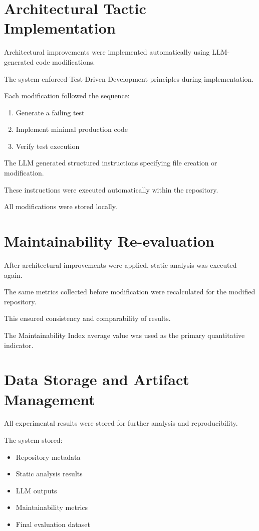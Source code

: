 \section{Architectural Tactic Implementation}

Architectural improvements were implemented automatically using LLM-generated code modifications.

The system enforced Test-Driven Development principles during implementation.

Each modification followed the sequence:

\begin{enumerate}
\item Generate a failing test
\item Implement minimal production code
\item Verify test execution
\end{enumerate}

The LLM generated structured instructions specifying file creation or modification.

These instructions were executed automatically within the repository.

All modifications were stored locally.

\section{Maintainability Re-evaluation}

After architectural improvements were applied, static analysis was executed again.

The same metrics collected before modification were recalculated for the modified repository.

This ensured consistency and comparability of results.

The Maintainability Index average value was used as the primary quantitative indicator.

\section{Data Storage and Artifact Management}

All experimental results were stored for further analysis and reproducibility.

The system stored:

\begin{itemize}
\item Repository metadata
\item Static analysis results
\item LLM outputs
\item Maintainability metrics
\item Final evaluation dataset
\end{itemize}

